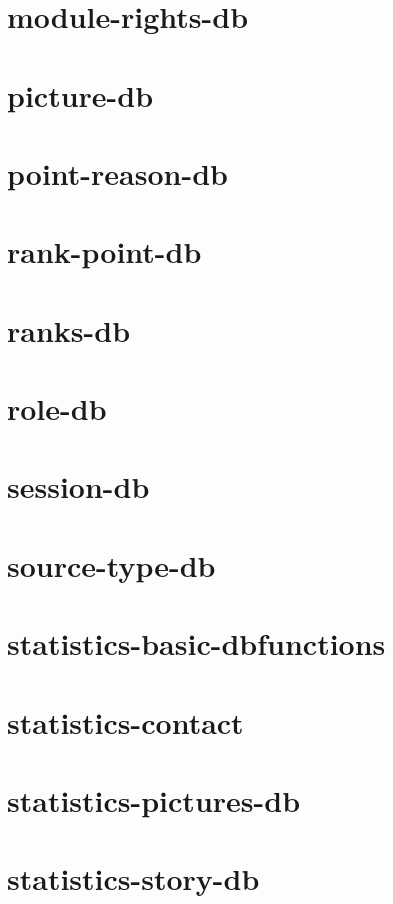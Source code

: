 \section{module-rights-db}

\newpage
\section{picture-db}

\newpage
\section{point-reason-db}

\newpage
\section{rank-point-db}

\newpage
\section{ranks-db}

\newpage
\section{role-db}

\newpage
\section{session-db}

\newpage
\section{source-type-db}

\newpage
\section{statistics-basic-dbfunctions}

\newpage
\section{statistics-contact}

\newpage
\section{statistics-pictures-db}

\newpage
\section{statistics-story-db}

\newpage
